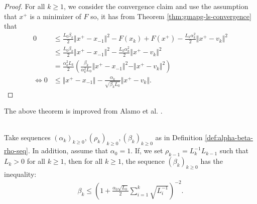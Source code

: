\documentclass[12pt]{report}
\begin{document}
\begin{proof}
            For all $k \ge 1$, we consider the convergence claim and use the assumption that $x^+$ is a minimizer of $F$ so, it has from Theorem \ref{thm:gmapg-ls-convergence} that 
            \begin{align*}
                0 &\le \frac{L_0\beta_k }{2}\Vert x^+ - x_{-1}\Vert^2 
                - F(x_k) + F(x^+) - \frac{L_k\alpha_k^2}{2}\Vert x^+ - v_k\Vert^2
                \\
                &\le 
                \frac{L_0\beta_k }{2}\Vert x^+ - x_{-1}\Vert^2 
                - \frac{L_k\alpha_k^2}{2}\Vert x^+ - v_k\Vert^2
                \\
                &= \frac{\alpha_k^2L_k}{2}\left(
                    \frac{\beta_k}{\alpha_k^2L_0}
                    \Vert x^+ - x_{-1}\Vert^2 
                    - \Vert x^+ - v_k\Vert^2
                \right)
                \\
                \iff 
                0 &\le 
                \Vert x^+ - x_{-1}\Vert - \frac{\alpha_k}{\sqrt{\beta_k L_0}}\Vert x^+ - v_k\Vert. 
            \end{align*}
        \end{proof}
        \begin{remark}
            The above theorem is improved from Alamo et al. \cite{alamo_restart_2019}. 
        \end{remark}
        \begin{lemma}\;\label{lemma:gmapg-seq-bnd}\\
            Take sequences $(\alpha_k)_{k \ge 0}, (\rho_k)_{k \ge 0}, (\beta_k)_{k \ge 0}$ as in Definition \ref{def:alpha-beta-rho-seq}. 
            In addition, assume that $\alpha_0 = 1$. 
            If, we set $\rho_{k - 1} = L_{k}^{-1}L_{k - 1}$ such that $L_k >0$ for all $k \ge 1$, then for all $k \ge 1$, the sequence $(\beta_k)_{k \ge 0}$ has the inequality: 
            \begin{align*}
                \beta_k \le \left(
                    1 + \frac{\alpha_0\sqrt{L_0}}{2}\sum_{i = 1}^{k} \sqrt{L_i^{-1}}
                \right)^{-2}. 
            \end{align*}
        \end{lemma}
\end{document}
